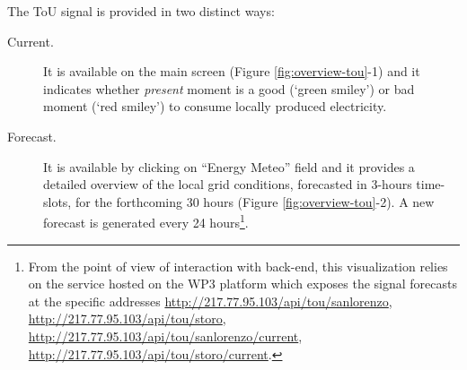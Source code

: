 The ToU signal is provided in two distinct ways:
\begin{description}
 \item[Current.] It is available on the main screen (Figure \ref{fig:overview-tou}-1) and it indicates whether \textit{present} moment is a good (`green smiley') or bad moment (`red smiley')
 to consume locally produced electricity.
 \item[Forecast.] It is available by clicking on ``Energy Meteo'' field and it provides a detailed overview of the local grid conditions, forecasted in 3-hours time-slots, for the forthcoming 30 hours (Figure \ref{fig:overview-tou}-2). A new forecast is generated every 24 hours\footnote{From the point of view of interaction with back-end, this visualization relies on the
 service hosted on the WP3 platform which exposes the signal forecasts at the specific addresses \url{http://217.77.95.103/api/tou/sanlorenzo}, \url{http://217.77.95.103/api/tou/storo},
 \url{http://217.77.95.103/api/tou/sanlorenzo/current}, \url{http://217.77.95.103/api/tou/storo/current}.}.
\end{description}



